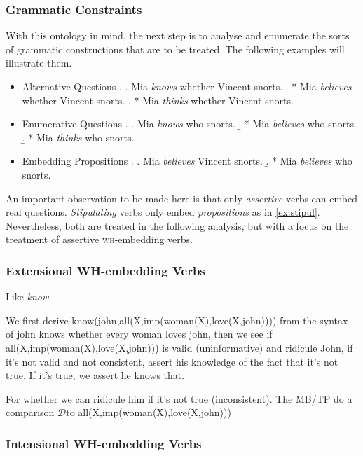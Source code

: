 \documentclass[12pt,a4paper]{article}
\newcommand{\Disc}{\ensuremath{\mathcal{D}}} %
\newcommand{\wh}{\textsc{wh}} %
\theoremstyle{remark} \newtheorem*{termin}{Terminology} %
\begin{document}
\subsubsection{Grammatic Constraints}

With this ontology in mind, the next step is to analyse and enumerate the sorts
of grammatic constructions that are to be treated. The following examples will
illustrate them.

\begin{itemize}
  \item Alternative Questions
  \ex. \a. Mia \emph{knows} whether Vincent snorts.
  \b. * Mia \emph{believes} whether Vincent snorts.
  \b. * Mia \emph{thinks} whether Vincent snorts.
  
  \item Enumerative Questions
  \ex. \a.  Mia \emph{knows} who snorts.
  \b. * Mia \emph{believes} who snorts.
  \b. * Mia \emph{thinks} who snorts.

  \item Embedding Propositions
  \ex. \label{ex:stipul}
  \a. Mia \emph{believes} Vincent snorts.
  \b. * Mia \emph{believes} who snorts.

\end{itemize}

An important observation to be made here is that only \emph{assertive} verbs can
embed real questions. \emph{Stipulating} verbs only embed \emph{propositions} as
in \ref{ex:stipul}.
Nevertheless, both are treated in the following analysis, but with a focus on
the treatment of assertive \wh-embedding verbs.


\subsubsection{Extensional WH-embedding Verbs}

Like \emph{know}.

We first derive know(john,all(X,imp(woman(X),love(X,john)))) from the syntax of
john knows whether every woman loves john, then we see if
all(X,imp(woman(X),love(X,john))) is valid (uninformative) and ridicule John, if
it's not valid and not consistent, assert his knowledge of the fact that it's
not true. If it's true, we assert he knows that.

For whether we can ridicule him if it's not true (inconsistent).
The MB/TP do a comparison \Disc to all(X,imp(woman(X),love(X,john)))

\subsubsection{Intensional WH-embedding Verbs}
\end{document}
